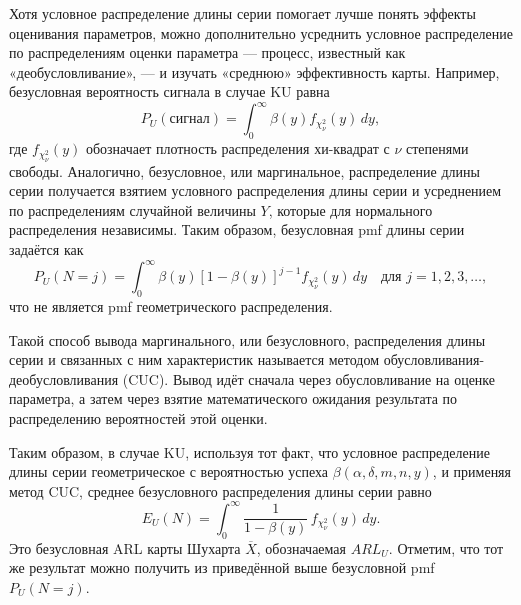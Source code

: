 Хотя условное распределение длины серии помогает лучше понять эффекты оценивания параметров, можно дополнительно усреднить условное распределение по распределениям оценки параметра — процесс, известный как «деобусловливание», — и изучать «среднюю» эффективность карты. Например, безусловная вероятность сигнала в случае KU равна
\[
	P_U(\text{сигнал}) = \int_0^{\infty} \beta(y) f_{\chi^2_\nu}(y)\,dy,
\]
где \(f_{\chi^2_\nu}(y)\) обозначает плотность распределения хи-квадрат с \(\nu\) степенями свободы. Аналогично, безусловное, или маргинальное, распределение длины серии получается взятием условного распределения длины серии и усреднением по распределениям случайной величины \(Y\), которые для нормального распределения независимы. Таким образом, безусловная pmf длины серии задаётся как
\[
	P_U(N = j) = \int_0^{\infty} \beta(y)[1 - \beta(y)]^{j-1} f_{\chi^2_\nu}(y)\,dy
	\quad\text{для } j = 1, 2, 3, \ldots,
\]
что не является pmf геометрического распределения.

Такой способ вывода маргинального, или безусловного, распределения длины серии и связанных с ним характеристик называется методом обусловливания-деобусловливания (CUC). Вывод идёт сначала через обусловливание на оценке параметра, а затем через взятие математического ожидания результата по распределению вероятностей этой оценки.

Таким образом, в случае KU, используя тот факт, что условное распределение длины серии геометрическое с вероятностью успеха \(\beta(\alpha, \delta, m, n, y)\), и применяя метод CUC, среднее безусловного распределения длины серии равно
\[
	E_U(N) = \int_0^{\infty} \frac{1}{1 - \beta(y)}\, f_{\chi^2_\nu}(y)\,dy.
\]
Это безусловная ARL карты Шухарта \(\overline{X}\), обозначаемая \(ARL_U\). Отметим, что тот же результат можно получить из приведённой выше безусловной pmf \(P_U(N = j)\).

